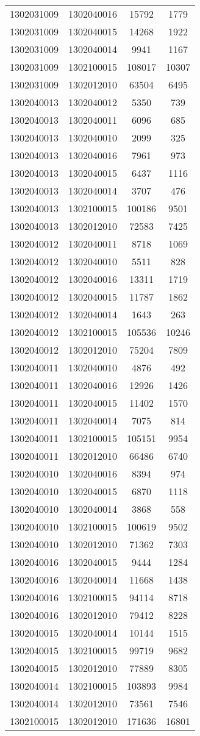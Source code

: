 \begin{longtable}{llcc}
1302031009 & 1302040016 & 15792 & 1779\\
1302031009 & 1302040015 & 14268 & 1922\\
1302031009 & 1302040014 & 9941 & 1167\\
1302031009 & 1302100015 & 108017 & 10307\\
1302031009 & 1302012010 & 63504 & 6495\\
1302040013 & 1302040012 & 5350 & 739\\
1302040013 & 1302040011 & 6096 & 685\\
1302040013 & 1302040010 & 2099 & 325\\
1302040013 & 1302040016 & 7961 & 973\\
1302040013 & 1302040015 & 6437 & 1116\\
1302040013 & 1302040014 & 3707 & 476\\
1302040013 & 1302100015 & 100186 & 9501\\
1302040013 & 1302012010 & 72583 & 7425\\
1302040012 & 1302040011 & 8718 & 1069\\
1302040012 & 1302040010 & 5511 & 828\\
1302040012 & 1302040016 & 13311 & 1719\\
1302040012 & 1302040015 & 11787 & 1862\\
1302040012 & 1302040014 & 1643 & 263\\
1302040012 & 1302100015 & 105536 & 10246\\
1302040012 & 1302012010 & 75204 & 7809\\
1302040011 & 1302040010 & 4876 & 492\\
1302040011 & 1302040016 & 12926 & 1426\\
1302040011 & 1302040015 & 11402 & 1570\\
1302040011 & 1302040014 & 7075 & 814\\
1302040011 & 1302100015 & 105151 & 9954\\
1302040011 & 1302012010 & 66486 & 6740\\
1302040010 & 1302040016 & 8394 & 974\\
1302040010 & 1302040015 & 6870 & 1118\\
1302040010 & 1302040014 & 3868 & 558\\
1302040010 & 1302100015 & 100619 & 9502\\
1302040010 & 1302012010 & 71362 & 7303\\
1302040016 & 1302040015 & 9444 & 1284\\
1302040016 & 1302040014 & 11668 & 1438\\
1302040016 & 1302100015 & 94114 & 8718\\
1302040016 & 1302012010 & 79412 & 8228\\
1302040015 & 1302040014 & 10144 & 1515\\
1302040015 & 1302100015 & 99719 & 9682\\
1302040015 & 1302012010 & 77889 & 8305\\
1302040014 & 1302100015 & 103893 & 9984\\
1302040014 & 1302012010 & 73561 & 7546\\
1302100015 & 1302012010 & 171636 & 16801\\
\end{longtable}
